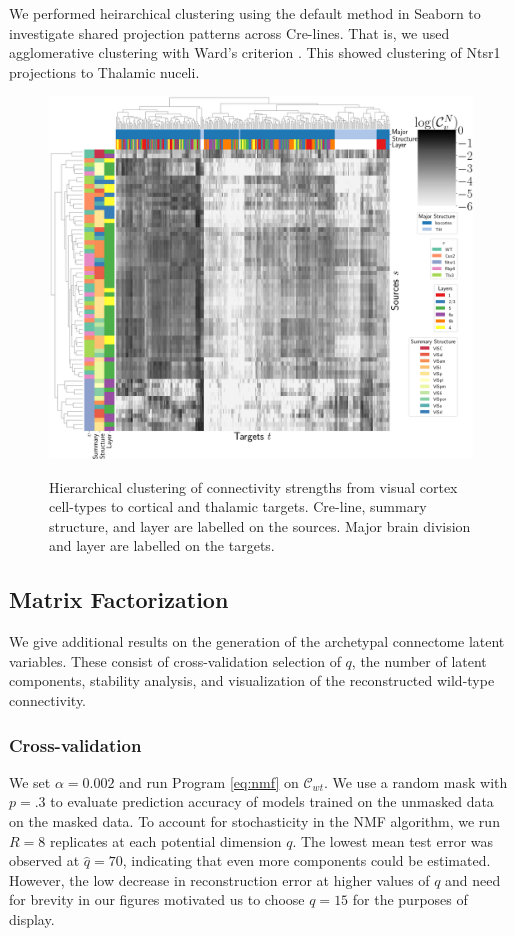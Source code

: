 \label{supp_sec:cell_type_specificity}

We performed heirarchical clustering using the default method in Seaborn \citep{Waskom2021} to investigate shared projection patterns across Cre-lines.
That is, we used agglomerative clustering with Ward's criterion \citet{Hastie_2009, Lalloue2013-is}.
This showed clustering of Ntsr1 projections to Thalamic nuceli.

\begin{figure}[H]
    \includegraphics[width=.6\textwidth]{figs/heirarchical.png}
     \label{fig:ct_clust2}
\caption{ Hierarchical clustering of connectivity strengths from visual cortex cell-types to cortical and thalamic targets.
		Cre-line, summary structure, and layer are labelled on the sources.
		Major brain division and layer are labelled on the targets.}
  \end{figure}
  
  
 \newpage
    
\subsection{Matrix Factorization}
\label{supp_sec:matrix_factor_results}

We give additional results on the generation of the archetypal connectome latent variables.
These consist of cross-validation selection of $q$, the number of latent components, stability analysis, and visualization of the reconstructed wild-type connectivity.

\subsubsection{Cross-validation}

We set $\alpha = 0.002$ and run Program \ref{eq:nmf} on $\mathcal C_{wt}$.
We use a random mask with $p = .3$ to evaluate prediction accuracy of models trained on the unmasked data on the masked data.
To account for stochasticity in the NMF algorithm, we run $R = 8$ replicates at each potential dimension $q$.
The lowest mean test error was observed at $\hat q = 70$, indicating that even more components could be estimated.
However, the low decrease in reconstruction error at higher values of $q$ and need for brevity in our figures motivated us to choose $q=15$ for the purposes of display.

